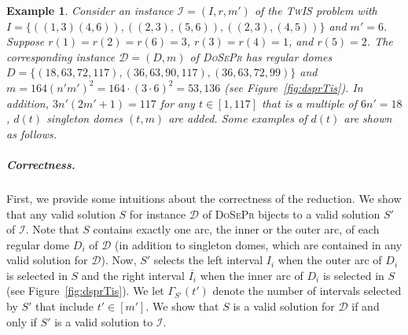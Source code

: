 \documentclass[letterpaper,11pt]{article}
\newtheorem{example}{Example}
\newcommand{\tis}{\textsc{TwIS}\xspace}
\newcommand{\dspr}{\textsc{DoSePr}\xspace}
\begin{document}
\begin{example}
\label{example::drpsrTis}
    Consider an instance $\mathcal{I} = (I,r,m')$ of the \tis problem with \linebreak $I = \{((1,3)(4,6)),((2,3),(5,6)), ((2,3),(4,5))\}$ and $m'=6$. Suppose $r(1)=r(2)=r(6)=3$,  $r(3)=r(4)=1$, and $r(5)=2$. The corresponding instance $\mathcal{D}=(D,m)$ of \dspr has regular domes $D= \{(18,63,72,117),(36,63,90,117),(36,63,72,99)\}$ and $m=164(n'm')^2=164\cdot(3\cdot6)^2 = 53,136$ (see Figure~\ref{fig:dsprTis}). In addition, $3n'(2m'+1) = 117$ for any $t \in [1,117]$ that is a multiple of $6n'=18$, $d(t)$ singleton domes $(t,m)$ are added. Some examples of $d(t)$ are shown as follows.

\end{example}

\subparagraph*{Correctness.}
First, we provide some intuitions about the correctness of the reduction. 
We show that any valid solution $S$ for instance $\mathcal{D}$ of \dspr bijects to a valid solution $S'$ of $\mathcal{I}$. 
Note that $S$ contains exactly one arc, the inner or the outer arc, of each regular dome $D_i$ of $\mathcal{D}$ (in addition to singleton domes, which are contained in any valid solution for $\mathcal{D}$). Now, $S'$
selects the left interval $I_i$ when the outer arc of $D_i$ is selected in $S$ and the right interval $\overline{I_i}$ when the inner arc of $D_i$ is selected in $S$ (see Figure~\ref{fig:dsprTis}).
We let $\Gamma_{S'}(t')$ denote the number of intervals selected by $S'$ that include $t'\in [m']$.
We show that $S$ is a valid solution for $\mathcal{D}$ if and only if $S'$ is a valid solution to $\mathcal{I}$.
\end{document}
